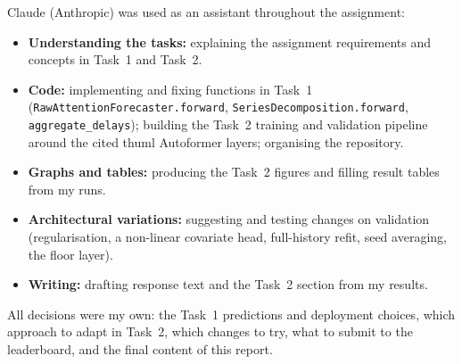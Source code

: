 \documentclass[11pt,a4paper]{article}
\begin{document}
Claude (Anthropic) was used as an assistant throughout the assignment:
\begin{itemize}
  \item \textbf{Understanding the tasks:} explaining the assignment requirements and concepts in Task~1 and Task~2.
  \item \textbf{Code:} implementing and fixing functions in Task~1 (\texttt{RawAttentionForecaster.forward}, \texttt{SeriesDecomposition.forward}, \texttt{aggregate\_delays}); building the Task~2 training and validation pipeline around the cited thuml Autoformer layers; organising the repository.
  \item \textbf{Graphs and tables:} producing the Task~2 figures and filling result tables from my runs.
  \item \textbf{Architectural variations:} suggesting and testing changes on validation (regularisation, a non-linear covariate head, full-history refit, seed averaging, the floor layer).
  \item \textbf{Writing:} drafting response text and the Task~2 section from my results.
\end{itemize}
All decisions were my own: the Task~1 predictions and deployment choices, which approach to adapt in Task~2, which changes to try, what to submit to the leaderboard, and the final content of this report.
\end{document}
